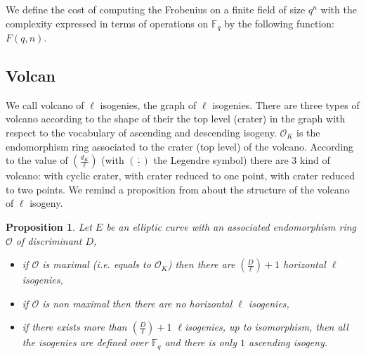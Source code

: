 \documentclass{lms}
\newtheorem{prop}[thm]{Proposition}
\begin{document}
\begin{defi}
We define the cost of computing the Frobenius on a finite field of size $q^n$ with the complexity expressed in terms of operations on $\mathbb{F}_q$ by the following function: $F(q,n)$.
\end{defi}

\subsection{Volcan}
We call volcano of $\ell$ isogenies, the graph of $\ell$ isogenies. There are three types of volcano according to the shape of their the top level (crater) in the graph with respect to the vocabulary of ascending and descending isogeny. $\mathcal{O}_K$ is the endomorphism ring associated to the crater (top level) of the volcano. According to the value of $\left( \frac{d_{K}}{\ell} \right)$ (with $\left( \frac{\cdot}{\cdot} \right)$ the Legendre symbol) there are $3$ kind of volcano: with cyclic crater, with crater reduced to one point, with crater reduced to two points. We remind a proposition from \cite{kohel} about the structure of the volcano of $\ell$ isogeny.
\begin{prop} %
Let $E$ be an elliptic curve with an associated endomorphism ring $\mathcal{O}$ of discriminant $D$, %
\begin{itemize}
\item if $\mathcal{O}$ is maximal (i.e. equals to $\mathcal{O}_K$) then there are $\left( \frac{D}{\ell} \right) +1 $ horizontal $\ell$ isogenies,
\item if $\mathcal{O}$ is non maximal then there are no horizontal $\ell$ isogenies,
\item if there exists more than $\left( \frac{D}{\ell} \right) +1 $  $\ell$isogenies, up to isomorphism, then all the isogenies are defined over $\mathbb{F}_q$ and there is only $1$ ascending isogeny. 
\end{itemize}
\end{prop} 
\end{document}
